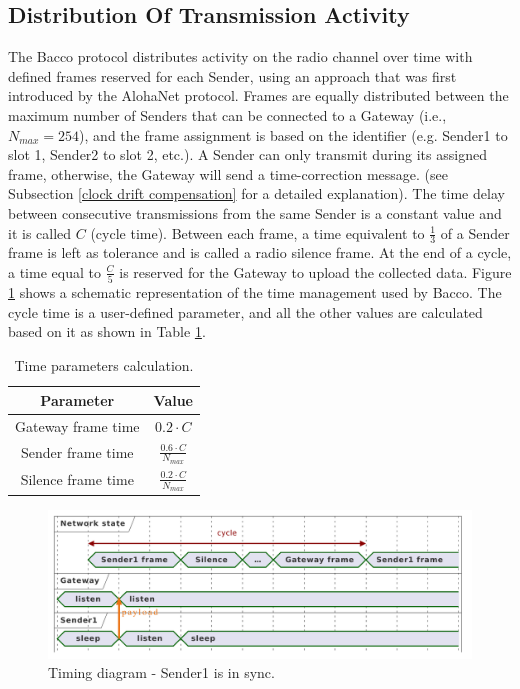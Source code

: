 \subsection{Distribution Of Transmission Activity}
The Bacco protocol distributes activity on the radio channel over time with defined frames reserved for each Sender,
using an approach that was first introduced by the AlohaNet \cite{alohanet} protocol. Frames are equally distributed
between the maximum number of Senders that can be connected to a Gateway (i.e., $N_{max} = 254$), and the frame
assignment is based on the identifier (e.g. Sender1 to slot 1, Sender2 to slot 2, etc.). A Sender can only transmit
during its assigned frame, otherwise, the Gateway will send a time-correction message. (see Subsection \ref{clock drift
compensation} for a detailed explanation). The time delay between consecutive transmissions from the same Sender is a
constant value and it is called $C$ (cycle time). Between each frame, a time equivalent to $\frac{1}{3}$ of a Sender
frame is left as tolerance and is called a radio silence frame. At the end of a cycle, a time equal to $\frac{C}{5}$ is
reserved for the Gateway to upload the collected data. Figure \ref{timing diagram case 1} shows a schematic
representation of the time management used by Bacco. The cycle time is a user-defined parameter, and all the other
values are calculated based on it as shown in Table \ref{timing table}.\\

\begin{table}[ht]
    \caption{Time parameters calculation.}
    \label{timing table}
    \centering
    \setlength{\extrarowheight}{7pt}
    \begin{tabular}{ |c|c| }
        \hline
        \textbf{Parameter} & \textbf{Value}\\
        \hline
        Gateway frame time & $0.2 \cdot C$\\
        Sender frame time & $\frac{0.6 \cdot C}{N_{max}}$\\
        Silence frame time & $\frac{0.2 \cdot C}{N_{max}}$\\
        \hline
    \end{tabular}
\end{table}

\begin{figure}[ht]
    \centering
    \includegraphics[width=1.0\textwidth]{uml/timings_case1.pdf}
    \caption{Timing diagram - Sender1 is in sync.}
    \label{timing diagram case 1}
\end{figure}

